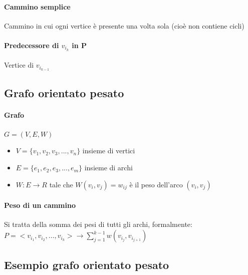 \paragraph*{Cammino semplice} Cammino in cui ogni vertice è presente una volta sola (cioè non
contiene cicli)
\paragraph*{Predecessore di $v_{i_k}$ in P} Vertice di $v_{i_{k-1}}$
\subsection{Grafo orientato pesato}
\paragraph*{Grafo} $G = (V,E,W)$
\begin{itemize}
    \item $V = \{v_1,v_2,v_3,...,v_n\}$ insieme di vertici
    \item $E= \{e_1,e_2,e_3,...,e_m\}$ insieme di archi
    \item $W:E \rightarrow R$ tale che $W(v_i,v_j) = w_{ij}$ è il peso dell'arco
    $(v_i,v_j)$
\end{itemize}
\paragraph*{Peso di un cammino} Si tratta della somma dei pesi di tutti gli
archi, formalmente: $P=<v_{i_1},v_{i_2},...,v_{i_k}> \rightarrow \sum^{k-1}_{j=1}w(v_{i_j},v_{i_{j+1}})$
\subsection{Esempio grafo orientato pesato}
\begin{center}
\end{center}
